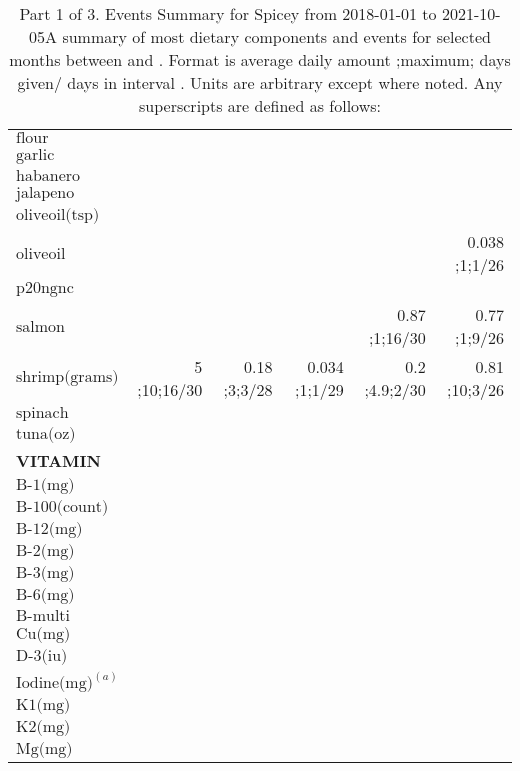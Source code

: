 \begin{table}[H]
\begin{tabular}{|l|r|r|r|r|r|}
$\textrm{flour}$&&&&&\\
$\textrm{garlic}$&&&&&\\
$\textrm{habanero}$&&&&&\\
$\textrm{jalapeno}$&&&&&\\
$\textrm{oliveoil(tsp)}$&&&&&\\
$\textrm{oliveoil}$&&&&&0.038 ;1;1/26\\
$\textrm{p20ngnc}$&&&&&\\
$\textrm{salmon}$&&&&0.87 ;1;16/30&0.77 ;1;9/26\\
$\textrm{shrimp(grams)}$&5 ;10;16/30&0.18 ;3;3/28&0.034 ;1;1/29&0.2 ;4.9;2/30&0.81 ;10;3/26\\
$\textrm{spinach}$&&&&&\\
$\textrm{tuna(oz)}$&&&&&\\
{\bf VITAMIN}&&&&&\\
$\textrm{B-1(mg)}$&&&&&\\
$\textrm{B-100(count)}$&&&&&\\
$\textrm{B-12(mg)}$&&&&&\\
$\textrm{B-2(mg)}$&&&&&\\
$\textrm{B-3(mg)}$&&&&&\\
$\textrm{B-6(mg)}$&&&&&\\
$\textrm{B-multi}$&&&&&\\
$\textrm{Cu(mg)}$&&&&&\\
$\textrm{D-3(iu)}$&&&&&\\
$\textrm{Iodine(mg)}^{\left(a\right)}$&&&&&\\
$\textrm{K1(mg)}$&&&&&\\
$\textrm{K2(mg)}$&&&&&\\
$\textrm{Mg(mg)}$&&&&&\\
\hline
\end{tabular}
\caption{Part 1 of 3.  Events Summary for Spicey   from 2018-01-01 to 2021-10-05A summary of most dietary components and events  for selected months between \mjmdatemin and \mjmdatemax. Format is average daily amount ;maximum; days given/ days in interval . Units are arbitrary except where noted. Any  superscripts are defined as follows:  \mjmsuperscripts}
\end{table}
